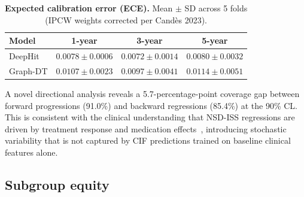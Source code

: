 \documentclass[11pt]{article}
\begin{document}
\begin{table}[!t]
\centering
\caption{\textbf{Expected calibration error (ECE).} Mean $\pm$ SD across 5 folds (IPCW weights corrected per Cand\`{e}s 2023).}
\label{tab:calib}
\begin{tabular}{@{}lccc@{}}
\toprule
\textbf{Model} & \textbf{1-year} & \textbf{3-year} & \textbf{5-year} \\
\midrule
DeepHit  & $\mathbf{0.0078 \pm 0.0006}$ & $\mathbf{0.0072 \pm 0.0014}$ & $\mathbf{0.0080 \pm 0.0032}$ \\
Graph-DT & $0.0107 \pm 0.0023$ & $0.0097 \pm 0.0041$ & $0.0114 \pm 0.0051$ \\
\bottomrule
\end{tabular}
\end{table}

A novel directional analysis reveals a 5.7-percentage-point coverage gap between forward progressions (91.0\%) and backward regressions (85.4\%) at the 90\% CL. This is consistent with the clinical understanding that NSD-ISS regressions are driven by treatment response and medication effects~\cite{espay2025refutation,tomlinson2010systematic}, introducing stochastic variability that is not captured by CIF predictions trained on baseline clinical features alone.

\subsection*{Subgroup equity}
\end{document}
